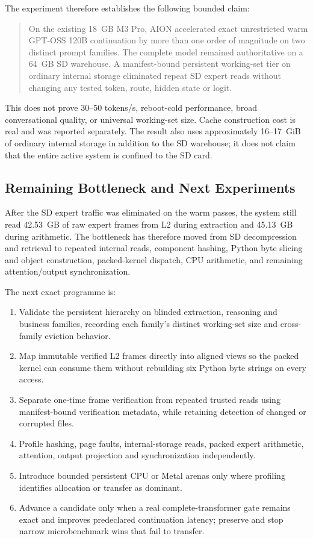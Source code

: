 The experiment therefore establishes the following bounded claim:

\begin{quote}
On the existing 18~GB M3 Pro, AION accelerated exact unrestricted warm
GPT-OSS 120B continuation by more than one order of magnitude on two distinct
prompt families.  The complete model remained authoritative on a 64~GB SD
warehouse.  A manifest-bound persistent working-set tier on ordinary internal
storage eliminated repeat SD expert reads without changing any tested token,
route, hidden state or logit.
\end{quote}

This does not prove 30--50 tokens/s, reboot-cold performance, broad conversational
quality, or universal working-set size.  Cache construction cost is real and
was reported separately.  The result also uses approximately 16--17~GiB of
ordinary internal storage in addition to the SD warehouse; it does not claim
that the entire active system is confined to the SD card.

\subsection{Remaining Bottleneck and Next Experiments}

After the SD expert traffic was eliminated on the warm passes, the system still
read 42.53~GB of raw expert frames from L2 during extraction and 45.13~GB during
arithmetic.  The bottleneck has therefore moved from SD decompression and
retrieval to repeated internal reads, component hashing, Python byte slicing
and object construction, packed-kernel dispatch, CPU arithmetic, and remaining
attention/output synchronization.

The next exact programme is:

\begin{enumerate}
  \item Validate the persistent hierarchy on blinded extraction, reasoning and
  business families, recording each family's distinct working-set size and
  cross-family eviction behavior.
  \item Map immutable verified L2 frames directly into aligned views so the
  packed kernel can consume them without rebuilding six Python byte strings on
  every access.
  \item Separate one-time frame verification from repeated trusted reads using
  manifest-bound verification metadata, while retaining detection of changed
  or corrupted files.
  \item Profile hashing, page faults, internal-storage reads, packed expert
  arithmetic, attention, output projection and synchronization independently.
  \item Introduce bounded persistent CPU or Metal arenas only where profiling
  identifies allocation or transfer as dominant.
  \item Advance a candidate only when a real complete-transformer gate remains
  exact and improves predeclared continuation latency; preserve and stop narrow
  microbenchmark wins that fail to transfer.
\end{enumerate}

